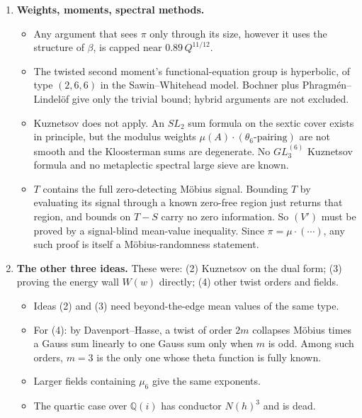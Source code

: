 \documentclass[11pt]{article}
\theoremstyle{definition}
\theoremstyle{remark}
\newcommand{\Q}{\mathbb{Q}}
\begin{document}
\begin{enumerate}[leftmargin=*]
\begin{itemize}[leftmargin=*]
    \begin{itemize}
    \item $0.554$;
    \item $0.413$, which equals CS;
    \item $0.891$, using the heuristic conductor;
    \item $0.587$, a random-size normalisation of a form that contains the signal.
    \end{itemize}
  \item None of these beats CS.
  \item The faithful 4-node object is of infinite type. A search of $10{,}476$ chambers found the same four forms. This corrects an earlier finite object, which encoded the conjugate, non-zero-detecting pairing.
  \end{itemize}
\item \textbf{Weights, moments, spectral methods.}
  \begin{itemize}[leftmargin=*]
  \item Any argument that sees $\pi$ only through its size, however it uses the structure of $\beta$, is capped near $0.89\,Q^{11/12}$.
  \item The twisted second moment's functional-equation group is hyperbolic, of type $(2,6,6)$ in the Sawin--Whitehead model. Bochner plus Phragm\'en--Lindel\"of give only the trivial bound; hybrid arguments are not excluded.
  \item Kuznetsov does not apply. An $SL_2$ sum formula on the sextic cover exists in principle, but the modulus weights $\mu(A)\cdot(\theta_6\text{-pairing})$ are not smooth and the Kloosterman sums are degenerate. No $GL_3^{(6)}$ Kuznetsov formula and no metaplectic spectral large sieve are known.
  \item $T$ contains the full zero-detecting M\"obius signal. Bounding $T$ by evaluating its signal through a known zero-free region just returns that region, and bounds on $T-S$ carry no zero information. So $(V')$ must be proved by a signal-blind mean-value inequality. Since $\pi=\mu\cdot(\cdots)$, any such proof is itself a M\"obius-randomness statement.
  \end{itemize}
\item \textbf{The other three ideas.} These were: (2) Kuznetsov on the dual form; (3) proving the energy wall $W(w)$ directly; (4) other twist orders and fields.
  \begin{itemize}[leftmargin=*]
  \item Ideas (2) and (3) need beyond-the-edge mean values of the same type.
  \item For (4): by Davenport--Hasse, a twist of order $2m$ collapses M\"obius times a Gauss sum linearly to one Gauss sum only when $m$ is odd. Among such orders, $m=3$ is the only one whose theta function is fully known.
  \item Larger fields containing $\mu_6$ give the same exponents.
  \item The quartic case over $\Q(i)$ has conductor $N(h)^3$ and is dead.
  \end{itemize}
\end{enumerate}
\end{document}
